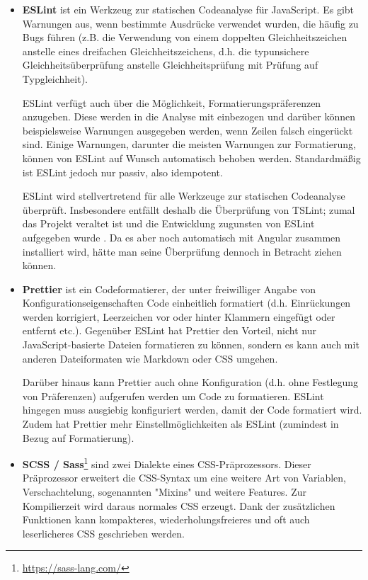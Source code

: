 \begin{itemize}
\item \textbf{ESLint} ist ein Werkzeug zur statischen Codeanalyse für JavaScript. Es gibt Warnungen aus, wenn bestimmte Ausdrücke verwendet wurden, die häufig zu Bugs führen (z.B. die Verwendung von einem doppelten Gleichheitszeichen anstelle eines dreifachen Gleichheitszeichens, d.h. die typunsichere Gleichheitsüberprüfung anstelle Gleichheitsprüfung mit Prüfung auf Typgleichheit).

ESLint verfügt auch über die Möglichkeit, Formatierungspräferenzen anzugeben. Diese werden in die Analyse mit einbezogen und darüber können beispielsweise Warnungen ausgegeben werden, wenn Zeilen falsch eingerückt sind. Einige Warnungen, darunter die meisten Warnungen zur Formatierung, können von ESLint auf Wunsch automatisch behoben werden. Standardmäßig ist ESLint jedoch nur passiv, also idempotent.

ESLint wird stellvertretend für alle Werkzeuge zur statischen Codeanalyse überprüft. Insbesondere entfällt deshalb die Überprüfung von TSLint; zumal das Projekt veraltet ist und die Entwicklung zugunsten von ESLint aufgegeben wurde \cite{tslint_deprecation} \cite{tslint_repo}. Da es aber noch automatisch mit Angular zusammen installiert wird, hätte man seine Überprüfung dennoch in Betracht ziehen können.

\item \textbf{Prettier} ist ein Codeformatierer, der unter freiwilliger Angabe von Konfigurationseigenschaften Code einheitlich formatiert (d.h. Einrückungen werden korrigiert, Leerzeichen vor oder hinter Klammern eingefügt oder entfernt etc.). Gegenüber ESLint hat Prettier den Vorteil, nicht nur JavaScript-basierte Dateien formatieren zu können, sondern es kann auch mit anderen Dateiformaten wie Markdown oder CSS umgehen.

Darüber hinaus kann Prettier auch ohne Konfiguration (d.h. ohne Festlegung von Präferenzen) aufgerufen werden um Code zu formatieren. ESLint hingegen muss ausgiebig konfiguriert werden, damit der Code formatiert wird. Zudem hat Prettier mehr Einstellmöglichkeiten als ESLint (zumindest in Bezug auf Formatierung).

\item \textbf{SCSS / Sass}\footnote{\url{https://sass-lang.com/}} sind zwei Dialekte eines CSS-Präprozessors. Dieser Präprozessor erweitert die CSS-Syntax um eine weitere Art von Variablen, Verschachtelung, sogenannten "Mixins" und weitere Features. Zur Kompilierzeit wird daraus normales CSS erzeugt. Dank der zusätzlichen Funktionen kann kompakteres, wiederholungsfreieres und oft auch leserlicheres CSS geschrieben werden.


\end{itemize}
